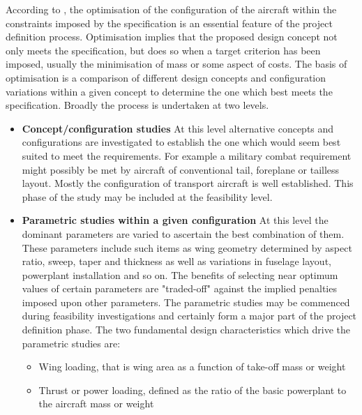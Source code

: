 According to \cite{howe2000aircraft}, the optimisation of the configuration of the aircraft within the constraints imposed by the specification is an essential feature of the project definition process. Optimisation implies that the proposed design concept not only meets the specification, but does so when a target criterion has been imposed, usually the minimisation of mass or some aspect of costs.
%
The basis of optimisation is a comparison of different design concepts and configuration variations within a given concept to determine the one which best meets the specification. Broadly the process is undertaken at two levels.
%
\begin{itemize}
\item \textbf{Concept/configuration studies} At this level alternative concepts and configurations are investigated to establish the one which would seem best suited to meet the requirements. For example a military combat requirement might possibly be met by aircraft of conventional tail, foreplane or tailless layout. Mostly the configuration of transport aircraft is well established. This phase of the study may be included at the feasibility level.
\item \textbf{Parametric studies within a given configuration} At this level the dominant parameters are varied to ascertain the best combination of them. These parameters include such items as wing geometry determined by aspect ratio, sweep, taper and thickness as well as variations in fuselage layout, powerplant installation and so on. The benefits of selecting near optimum values of certain parameters are "traded-off" against the implied penalties
imposed upon other parameters. The parametric studies may be commenced during feasibility investigations and certainly form a major part of the project definition phase. The two fundamental design characteristics which drive the parametric studies are:
\begin{itemize}
\item Wing loading, that is wing area as a function of take-off mass or weight
\item Thrust or power loading, defined as the ratio of the basic powerplant to the aircraft mass or weight
\end{itemize}
\end{itemize}
\noindent \\


